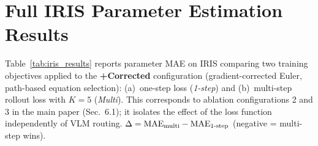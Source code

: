\documentclass[runningheads]{llncs}
\begin{document}
\section{Full IRIS Parameter Estimation Results}
\label{app:iris_full_results}

Table~\ref{tab:iris_results} reports parameter MAE on IRIS comparing two
training objectives applied to the \textbf{+Corrected} configuration
(gradient-corrected Euler, path-based equation selection):
(a)~one-step loss (\emph{1-step}) and
(b)~multi-step rollout loss with $K{=}5$ (\emph{Multi}).
This corresponds to ablation configurations 2 and 3 in the main paper
(Sec.~6.1); it isolates the effect of the loss function independently
of VLM routing.
$\Delta = \mathrm{MAE}_{\rm multi} - \mathrm{MAE}_{\rm 1\text{-}step}$
(negative = multi-step wins).
\end{document}
